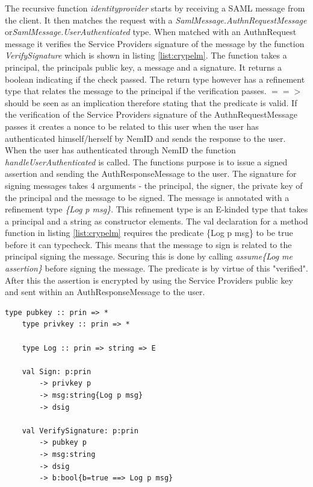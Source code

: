 \documentclass[twosided]{report}
\begin{document}
The recursive function \emph{identityprovider} starts by receiving a SAML message from the client. It then matches the request with a \emph{SamlMessage.AuthnRequestMessage} or\emph{SamlMessage.UserAuthenticated} type. When matched with an AuthnRequest message it verifies the Service Providers signature of the message by the function \emph{VerifySignature} which is shown in listing \ref{list:crypelm}. The function takes a principal, the principals public key, a message and a signature. It returns a boolean indicating if the check passed. The return type however has a refinement type that relates the message to the principal if the verification passes. $==>$ should be seen as an implication therefore stating that the predicate is valid. If the verification of the Service Providers signature of the AuthnRequestMessage passes it creates a nonce to be related to this user when the user has authenticated himself/herself by NemID and sends the response to the user. When the user has authenticated through NemID the function \emph{handleUserAuthenticated} is called. The functions purpose is to issue a signed assertion and sending the AuthResponseMessage to the user. The signature for signing messages takes 4 arguments - the principal, the signer, the private key of the principal and the message to be signed. The message is annotated with a refinement type \emph{\{Log p msg\}}. This refinement type is an E-kinded type that takes a principal and a string as constructor elements. The val declaration for a method function in listing \ref{list:crypelm} requires the predicate \{Log p msg\} to be true before it can typecheck. This means that the message to sign is related to the principal signing the message. Securing this is done by calling \emph{assume\{Log me assertion\}} before signing the message. The predicate is by virtue of this "verified". After this the assertion is encrypted by using the Service Providers public key and sent within an AuthResponseMessage to the user.

\begin{lstlisting}[style=fstar, caption={Cryptographic elements}, label={list:crypelm}]
	type pubkey :: prin => *
	type privkey :: prin => *

	type Log :: prin => string => E
	
	val Sign: p:prin
		-> privkey p
		-> msg:string{Log p msg}
		-> dsig

	val VerifySignature: p:prin
		-> pubkey p 	
		-> msg:string
		-> dsig
		-> b:bool{b=true ==> Log p msg}
\end{lstlisting}
\end{document}
